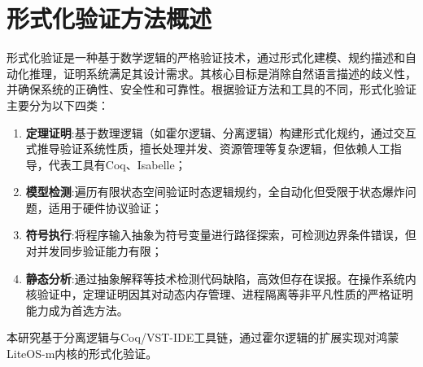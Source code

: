 \section{形式化验证方法概述}
\label{sec:formal-methods}
形式化验证是一种基于数学逻辑的严格验证技术，通过形式化建模、规约描述和自动化推理，证明系统满足其设计需求。其核心目标是消除自然语言描述的歧义性，并确保系统的正确性、安全性和可靠性。根据验证方法和工具的不同，形式化验证主要分为以下四类：
\begin{enumerate}
    \item \textbf{定理证明}:基于数理逻辑（如霍尔逻辑、分离逻辑）构建形式化规约，通过交互式推导验证系统性质，擅长处理并发、资源管理等复杂逻辑，但依赖人工指导，代表工具有Coq、Isabelle；
    \item \textbf{模型检测}:遍历有限状态空间验证时态逻辑规约，全自动化但受限于状态爆炸问题，适用于硬件协议验证；
    \item \textbf{符号执行}:将程序输入抽象为符号变量进行路径探索，可检测边界条件错误，但对并发同步验证能力有限；
    \item \textbf{静态分析}:通过抽象解释等技术检测代码缺陷，高效但存在误报。在操作系统内核验证中，定理证明因其对动态内存管理、进程隔离等非平凡性质的严格证明能力成为首选方法。
\end{enumerate}

本研究基于分离逻辑与Coq/VST-IDE工具链，通过霍尔逻辑的扩展实现对鸿蒙LiteOS-m内核的形式化验证。

